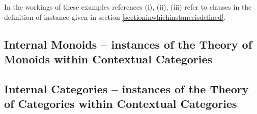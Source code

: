 \documentclass[10pt,a4paper]{article}
\theoremstyle{remark}
\begin{document}
In the workings of these examples references (i), (ii), (iii)  refer to clauses in the  definition of instance given in 
section \ref{sectioninwhichinstanceisdefined}.

\subsection{Internal Monoids -- instances of the Theory of Monoids within Contextual Categories}
\label{monoidsinstanceexample} 
 

\subsection{Internal Categories -- instances of the Theory of Categories within Contextual Categories}
\label{categoriesinstanceexample}


%

% 


\end{document}
